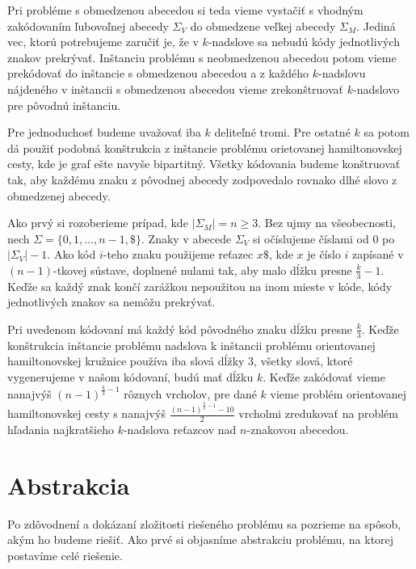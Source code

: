 Pri probléme s obmedzenou abecedou si teda vieme vystačiť s vhodným zakódovaním
ľubovoľnej abecedy $\Sigma_V$ do obmedzene veľkej abecedy $\Sigma_M$. Jediná vec, ktorú potrebujeme zaručiť
je, že v $k$-nadslove sa nebudú kódy jednotlivých znakov prekrývať. Inštanciu
problému s neobmedzenou abecedou potom vieme prekódovať do inštancie s obmedzenou
abecedou a z každého $k$-nadslovu nájdeného v inštancii s obmedzenou abecedou
vieme zrekonštruovať $k$-nadslovo pre pôvodnú inštanciu.

Pre jednoduchosť budeme uvažovať iba $k$ deliteľné tromi. Pre ostatné $k$ sa
potom dá použiť podobná konštrukcia z inštancie problému orietovanej hamiltonovskej cesty,
kde je graf ešte navyše bipartitný. Všetky kódovania budeme konštruovať tak, aby
každému znaku z pôvodnej abecedy zodpovedalo rovnako dlhé slovo z obmedzenej abecedy.

Ako prvý si rozoberieme prípad, kde $|\Sigma_M| = n \ge 3$. Bez ujmy na všeobecnosti,
nech $\Sigma = \{0, 1, \ldots, n-1, \$ \}$. Znaky v abecede $\Sigma_V$ si očíslujeme
číslami od $0$ po $|\Sigma_V| - 1$. Ako kód $i$-teho znaku použijeme reťazec
$x \$ $, kde $x$ je číslo $i$ zapísané v $(n-1)$-tkovej sústave, doplnené nulami tak,
aby malo dĺžku presne $\frac{k}{3} - 1$. Keďže sa každý znak končí zarážkou nepoužitou na
inom mieste v kóde, kódy jednotlivých znakov sa nemôžu prekrývať.

Pri uvedenom kódovaní má každý kód pôvodného znaku dĺžku presne $\frac{k}{3}$. Keďže
konštrukcia inštancie problému nadslova k inštancii problému orientovanej hamiltonovskej
kružnice používa iba slová dĺžky $3$, všetky slová, ktoré vygenerujeme v našom kódovaní,
budú mať dĺžku $k$. Keďže zakódovať vieme nanajvýš $(n-1)^{\frac{k}{3} - 1}$ rôznych
vrcholov, pre dané $k$ vieme problém orientovanej hamiltonovskej cesty s nanajvýš
$\frac{(n-1)^{\frac{k}{3}-1} - 10}{2}$ vrcholmi zredukovať na problém hľadania
najkratšieho $k$-nadslova reťazcov nad $n$-znakovou abecedou.

\section{Abstrakcia}

Po zdôvodnení a dokázaní zložitosti riešeného problému sa pozrieme na spôsob, akým ho budeme
riešiť. Ako prvé si objasníme abstrakciu problému, na ktorej postavíme celé riešenie.

